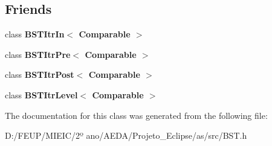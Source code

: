 \subsection*{Friends}
\begin{DoxyCompactItemize}
\item 
\mbox{\label{class_b_s_t_aab3993acac2ab24a0b59edb0c3acc775}} 
class {\bfseries B\+S\+T\+Itr\+In$<$ Comparable $>$}
\item 
\mbox{\label{class_b_s_t_a45a55df6f11541416d4ea7684c575c1a}} 
class {\bfseries B\+S\+T\+Itr\+Pre$<$ Comparable $>$}
\item 
\mbox{\label{class_b_s_t_a5dc153694be266f6e772659486219da7}} 
class {\bfseries B\+S\+T\+Itr\+Post$<$ Comparable $>$}
\item 
\mbox{\label{class_b_s_t_a26ff00bc0d87069aed877f10fd3c80a8}} 
class {\bfseries B\+S\+T\+Itr\+Level$<$ Comparable $>$}
\end{DoxyCompactItemize}


The documentation for this class was generated from the following file\+:\begin{DoxyCompactItemize}
\item 
D\+:/\+F\+E\+U\+P/\+M\+I\+E\+I\+C/2º ano/\+A\+E\+D\+A/\+Projeto\+\_\+\+Eclipse/as/src/B\+S\+T.\+h\end{DoxyCompactItemize}
